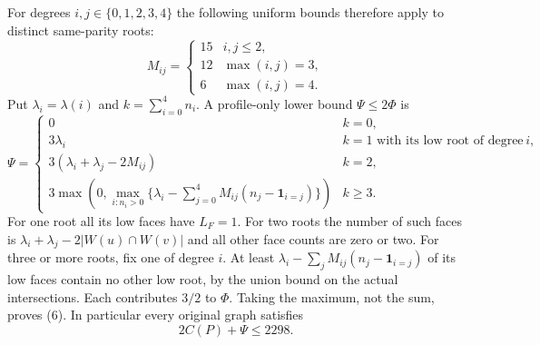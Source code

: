 \documentclass{article}
\begin{document}
For degrees $i,j\in\{0,1,2,3,4\}$ the following uniform bounds therefore
apply to distinct same-parity roots:
\[
M_{ij}=\begin{cases}15&i,j\le2,\\12&\max(i,j)=3,\\6&\max(i,j)=4.
\end{cases}                                                    \tag{5}
\]
Put $\lambda_i=\lambda(i)$ and $k=\sum_{i=0}^4n_i$. A profile-only
lower bound $\Psi\le2\Phi$ is
\[
\Psi=\begin{cases}
0&k=0,\\
3\lambda_i&k=1\text{ with its low root of degree }i,\\
3(\lambda_i+\lambda_j-2M_{ij})&k=2,\\
3\max\left(0,\max_{i:n_i>0}\{\lambda_i-
                \sum_{j=0}^4 M_{ij}(n_j-\mathbf1_{i=j})\}\right)&k\ge3.
\end{cases}                                                    \tag{6}
\]
For one root all its low faces have $L_F=1$. For two roots the number
of such faces is $\lambda_i+\lambda_j-2|W(u)\cap W(v)|$ and all other
face counts are zero or two. For three or more roots, fix one of degree
$i$. At least $\lambda_i-\sum_jM_{ij}(n_j-\mathbf1_{i=j})$ of its low
faces contain no other low root, by the union bound on the actual
intersections. Each contributes $3/2$ to $\Phi$. Taking the maximum,
not the sum, proves (6). In particular every original graph satisfies
\[
                  2C(P)+\Psi\le2298.                         \tag{7}
\]
\end{document}
